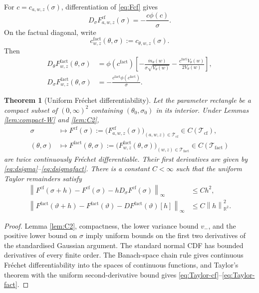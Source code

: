 \documentclass[11pt]{article}
\newtheorem{theorem}[assumption]{Theorem}
\theoremstyle{remark}
\newcommand{\R}{\mathbb R}
\newcommand{\cf}{\mathrm{cf}}
\newcommand{\fact}{\mathrm{fact}}
\newcommand{\cT}{\mathcal T}
\newcommand{\norm}[1]{\left\lVert #1\right\rVert}
\newcommand{\ph}{\phi}
\begin{document}
For $c=c_{a,w,z}(\sigma)$, differentiation of \eqref{eq:Fcf} gives
\begin{equation}\label{eq:dsigma}
 D_\sigma F^{\cf}_{a,w,z}(\sigma)
 =-\frac{c\ph(c)}{\sigma}.
\end{equation}
On the factual diagonal, write
\[
 c^{\fact}_{w,z}(\theta,\sigma)
 :=c_{\theta,w,z}(\sigma).
\]
Then
\begin{align}
 D_\theta F^{\fact}_{w,z}(\theta,\sigma)
 &=\ph(c^{\fact})
 \left[
 -\frac{\dot m_\theta(w)}{\sigma\sqrt{V_\theta(w)}}
 -\frac{c^{\fact}\dot V_\theta(w)}{2V_\theta(w)}
 \right],\label{eq:dtheta}\\
 D_\sigma F^{\fact}_{w,z}(\theta,\sigma)
 &=-\frac{c^{\fact}\ph(c^{\fact})}{\sigma}.\label{eq:dsigmafact}
\end{align}

\begin{theorem}[Uniform Fr\'echet differentiability]\label{thm:Frechet}
Let the parameter rectangle be a compact subset of $(0,\infty)^2$ containing $(\theta_0,\sigma_0)$ in its interior.  Under Lemmas \ref{lem:compact-W} and \ref{lem:C2},
\begin{align*}
 \sigma&\longmapsto F^{\cf}(\sigma)
 :=\big(F^{\cf}_{a,w,z}(\sigma)\big)_{(a,w,z)\in\cT_{\cf}}
 \in C(\cT_{\cf}),\\
 (\theta,\sigma)&\longmapsto F^{\fact}(\theta,\sigma)
 :=\big(F^{\fact}_{w,z}(\theta,\sigma)\big)_{(w,z)\in\cT_{\fact}}
 \in C(\cT_{\fact})
\end{align*}
are twice continuously Fr\'echet differentiable.  Their first derivatives are given by \eqref{eq:dsigma}--\eqref{eq:dsigmafact}.  There is a constant $C<\infty$ such that the uniform Taylor remainders satisfy
\begin{align}
 \norm{F^{\cf}(\sigma+h)-F^{\cf}(\sigma)-hD_\sigma F^{\cf}(\sigma)}_\infty
 &\le Ch^2,\label{eq:Taylor-cf}\\
 \norm{F^{\fact}(\vartheta+h)-F^{\fact}(\vartheta)-DF^{\fact}(\vartheta)[h]}_\infty
 &\le C\norm{h}_{\R^2}^2.\label{eq:Taylor-fact}
\end{align}

\end{theorem}

\begin{proof}
Lemma \ref{lem:C2}, compactness, the lower variance bound $v_-$, and the positive lower bound on $\sigma$ imply uniform bounds on the first two derivatives of the standardised Gaussian argument.  The standard normal CDF has bounded derivatives of every finite order.  The Banach-space chain rule gives continuous Fr\'echet differentiability into the spaces of continuous functions, and Taylor's theorem with the uniform second-derivative bound gives \eqref{eq:Taylor-cf}--\eqref{eq:Taylor-fact}.
\end{proof}
\end{document}
